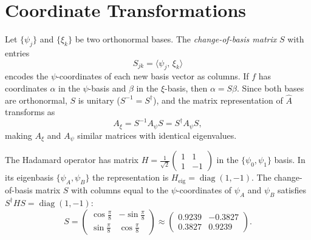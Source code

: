 \section{Coordinate Transformations}

Let $\{\psi_j\}$ and $\{\xi_k\}$ be two orthonormal bases. The \emph{change-of-basis matrix} $S$ with entries
\[
  S_{jk} = \langle\psi_j,\,\xi_k\rangle
\]
encodes the $\psi$-coordinates of each new basis vector as columns. If $f$ has coordinates $\alpha$ in the $\psi$-basis and $\beta$ in the $\xi$-basis, then $\alpha=S\beta$. Since both bases are orthonormal, $S$ is unitary ($S^{-1}=S^\dagger$), and the matrix representation of $\hat{A}$ transforms as
\[
  A_\xi = S^{-1}A_\psi S = S^\dagger A_\psi S,
\]
making $A_\xi$ and $A_\psi$ similar matrices with identical eigenvalues.

\begin{example}
The Hadamard operator has matrix $H=\frac{1}{\sqrt{2}}\begin{pmatrix}1&1\\1&-1\end{pmatrix}$ in the $\{\psi_0,\psi_1\}$ basis. In its eigenbasis $\{\psi_A,\psi_B\}$ the representation is $H_{\mathrm{eig}}=\operatorname{diag}(1,-1)$. The change-of-basis matrix $S$ with columns equal to the $\psi$-coordinates of $\psi_A$ and $\psi_B$ satisfies $S^\dagger H S=\operatorname{diag}(1,-1)$:
\[
  S = \begin{pmatrix}\cos\frac{\pi}{8} & -\sin\frac{\pi}{8}\\[4pt]\sin\frac{\pi}{8} & \cos\frac{\pi}{8}\end{pmatrix}
    \approx\begin{pmatrix}0.9239 & -0.3827\\0.3827 & 0.9239\end{pmatrix}.
\]
\end{example}

